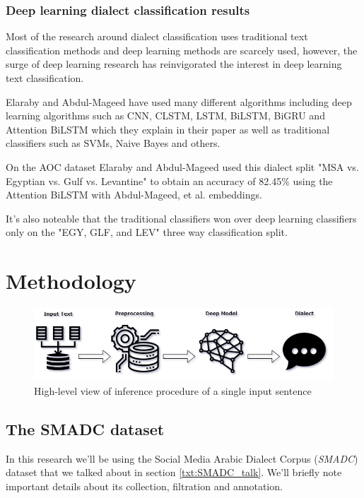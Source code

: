 \documentclass[12pt]{diazessay}
\begin{document}
        
        \subsubsection{Deep learning dialect classification results}
        Most of the research around dialect classification uses traditional text classification methods and deep learning methods are scarcely used, however, the surge of deep learning research has reinvigorated the interest in deep learning text classification.
        
        Elaraby and Abdul-Mageed have used many different algorithms including deep learning algorithms such as CNN, CLSTM, LSTM, BiLSTM, BiGRU and Attention BiLSTM which they explain in their paper as well as traditional classifiers such as SVMs, Naive Bayes and others\cite{elaraby-abdul-mageed-2018-deep}.
        
        On the AOC dataset Elaraby and Abdul-Mageed used this dialect split "MSA vs. Egyptian vs. Gulf vs. Levantine" to obtain an accuracy of 82.45\% using the Attention BiLSTM with Abdul-Mageed, et al. embeddings\cite{elaraby-abdul-mageed-2018-deep}.
        
        It's also noteable that the traditional classifiers won over deep learning classifiers only on the "EGY, GLF, and LEV" three way classification split\cite{elaraby-abdul-mageed-2018-deep}.
        
    
    \section{Methodology}
        \begin{figure}[h]
            \hskip-1.3cm
            \includegraphics[scale=0.6]{Figures/inference_figure.png}
            \caption{High-level view of inference procedure of a single input sentence}
            \label{fig:inference_figure}
        \end{figure}
        
            \subsection{The SMADC dataset}
            In this research we'll be using the Social Media Arabic Dialect Corpus (\emph{SMADC}) dataset that we talked about in section \ref{txt:SMADC_talk}. We'll briefly note important details about its collection, filtration and annotation.
            
\end{document}
